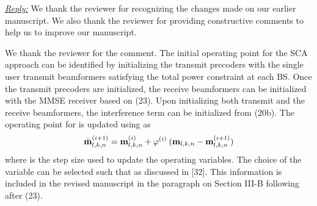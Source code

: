 
\vspace{1eM}
\underline{\textit{Reply:}} We thank the reviewer for recognizing the changes made on our earlier manuscript. We also thank the reviewer for providing constructive comments to help us to improve our manuscript.

\begin{enumerate}
 

\resp We thank the reviewer for the comment. The initial operating point for the \ac{SCA} approach can be identified by initializing the transmit precoders  with the single user transmit beamformers satisfying the total power constraint at each \ac{BS}. Once the transmit precoders are initialized, the receive beamformers  can be initialized with the \ac{MMSE} receiver based on (23). Upon initializing both transmit and the receive beamformers, the interference term  can be initialized from (20b). The operating point for  is updated using as 
\begin{equation}
\tilde{\mathbf{m}}_{l,k,n}^{(i+1)} = \mathbf{m}_{l,k,n}^{(i)} + \varphi^{(i)} \: (\mathbf{m}_{l,k,n} - \mathbf{m}_{l,k,n}^{(i+1)})
\end{equation}
where \eqn{\varphi^{(i)} \in (0,1]} is the step size used to update the operating variables. The choice of the variable  can be selected such that  as discussed in [32].
This information is included in the revised manuscript in the paragraph on Section III-B following after (23).

 


\end{enumerate}
